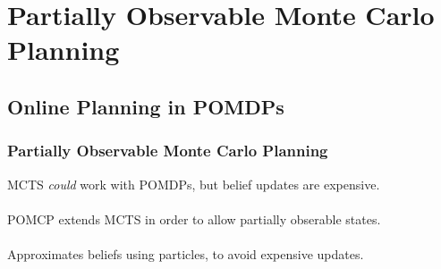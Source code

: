 \documentclass[xcolor={dvipsnames}]{beamer}
\begin{document}
\section[POMCP]{Partially Observable Monte Carlo Planning}
\subsection{Online Planning in POMDPs}
\begin{frame}
\frametitle{Partially Observable Monte Carlo Planning}
\begin{block}{}
MCTS \textit{could} work with POMDPs, but belief updates are expensive. \\~\\
POMCP extends MCTS in order to allow partially obserable states. \\~\\
Approximates beliefs using particles, to avoid expensive updates.
\end{block}
\end{frame}
\end{document}
